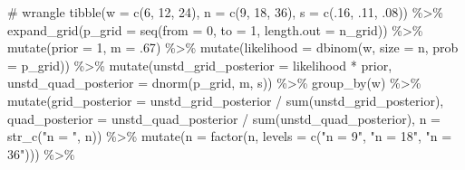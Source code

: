 \documentclass[
  letterpaper,
  DIV=11,
  numbers=noendperiod]{scrreprt}
\newenvironment{Shaded}{\begin{snugshade}}{\end{snugshade}}
\newcommand{\AttributeTok}[1]{\textcolor[rgb]{0.40,0.45,0.13}{#1}}
\newcommand{\CommentTok}[1]{\textcolor[rgb]{0.37,0.37,0.37}{#1}}
\newcommand{\DecValTok}[1]{\textcolor[rgb]{0.68,0.00,0.00}{#1}}
\newcommand{\FunctionTok}[1]{\textcolor[rgb]{0.28,0.35,0.67}{#1}}
\newcommand{\NormalTok}[1]{\textcolor[rgb]{0.00,0.23,0.31}{#1}}
\newcommand{\SpecialCharTok}[1]{\textcolor[rgb]{0.37,0.37,0.37}{#1}}
\newcommand{\StringTok}[1]{\textcolor[rgb]{0.13,0.47,0.30}{#1}}
\begin{document}
\begin{codelisting}
\begin{Shaded}
\begin{Highlighting}[]
\CommentTok{\# wrangle}
\FunctionTok{tibble}\NormalTok{(}\AttributeTok{w =} \FunctionTok{c}\NormalTok{(}\DecValTok{6}\NormalTok{, }\DecValTok{12}\NormalTok{, }\DecValTok{24}\NormalTok{),}
       \AttributeTok{n =} \FunctionTok{c}\NormalTok{(}\DecValTok{9}\NormalTok{, }\DecValTok{18}\NormalTok{, }\DecValTok{36}\NormalTok{),}
       \AttributeTok{s =} \FunctionTok{c}\NormalTok{(.}\DecValTok{16}\NormalTok{, .}\DecValTok{11}\NormalTok{, .}\DecValTok{08}\NormalTok{)) }\SpecialCharTok{\%\textgreater{}\%} 
  \FunctionTok{expand\_grid}\NormalTok{(}\AttributeTok{p\_grid =} \FunctionTok{seq}\NormalTok{(}\AttributeTok{from =} \DecValTok{0}\NormalTok{, }\AttributeTok{to =} \DecValTok{1}\NormalTok{, }\AttributeTok{length.out =}\NormalTok{ n\_grid)) }\SpecialCharTok{\%\textgreater{}\%} 
  \FunctionTok{mutate}\NormalTok{(}\AttributeTok{prior =} \DecValTok{1}\NormalTok{,}
         \AttributeTok{m     =}\NormalTok{ .}\DecValTok{67}\NormalTok{)  }\SpecialCharTok{\%\textgreater{}\%}
  \FunctionTok{mutate}\NormalTok{(}\AttributeTok{likelihood =} \FunctionTok{dbinom}\NormalTok{(w, }\AttributeTok{size =}\NormalTok{ n, }\AttributeTok{prob =}\NormalTok{ p\_grid)) }\SpecialCharTok{\%\textgreater{}\%}
  \FunctionTok{mutate}\NormalTok{(}\AttributeTok{unstd\_grid\_posterior =}\NormalTok{ likelihood }\SpecialCharTok{*}\NormalTok{ prior,}
         \AttributeTok{unstd\_quad\_posterior =} \FunctionTok{dnorm}\NormalTok{(p\_grid, m, s)) }\SpecialCharTok{\%\textgreater{}\%}
  \FunctionTok{group\_by}\NormalTok{(w) }\SpecialCharTok{\%\textgreater{}\%} 
  \FunctionTok{mutate}\NormalTok{(}\AttributeTok{grid\_posterior =}\NormalTok{ unstd\_grid\_posterior }\SpecialCharTok{/} \FunctionTok{sum}\NormalTok{(unstd\_grid\_posterior),}
         \AttributeTok{quad\_posterior =}\NormalTok{ unstd\_quad\_posterior }\SpecialCharTok{/} \FunctionTok{sum}\NormalTok{(unstd\_quad\_posterior),}
         \AttributeTok{n              =} \FunctionTok{str\_c}\NormalTok{(}\StringTok{"n = "}\NormalTok{, n)) }\SpecialCharTok{\%\textgreater{}\%} 
  \FunctionTok{mutate}\NormalTok{(}\AttributeTok{n =} \FunctionTok{factor}\NormalTok{(n, }\AttributeTok{levels =} \FunctionTok{c}\NormalTok{(}\StringTok{"n = 9"}\NormalTok{, }\StringTok{"n = 18"}\NormalTok{, }\StringTok{"n = 36"}\NormalTok{))) }\SpecialCharTok{\%\textgreater{}\%} 
  

\end{Highlighting}
\end{Shaded}
\end{codelisting}
\end{document}

